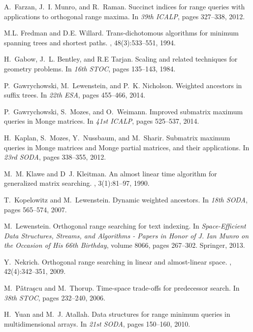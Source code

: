 \documentclass{llncs}
\begin{document}
\begin{thebibliography}{10}
A.~Farzan, J.~I. Munro, and R.~Raman.
\newblock Succinct indices for range queries with applications to orthogonal
  range maxima.
\newblock In {\em 39th ICALP}, pages 327--338, 2012.

M.L. Fredman and D.E. Willard.
\newblock Trans-dichotomous algorithms for minimum spanning trees and shortest
  paths.
, 48(3):533--551, 1994.

H.~Gabow, J.~L. Bentley, and R.E Tarjan.
\newblock Scaling and related techniques for geometry problems.
\newblock In {\em 16th STOC}, pages 135--143, 1984.

P.~Gawrychowski, M.~Lewenstein, and P.~K. Nicholson.
\newblock Weighted ancestors in suffix trees.
\newblock In {\em 22th ESA}, pages 455--466, 2014.

P.~Gawrychowski, S.~Mozes, and O.~Weimann.
\newblock Improved submatrix maximum queries in {M}onge matrices.
\newblock In {\em 41st ICALP}, pages 525--537, 2014.

H.~Kaplan, S.~Mozes, Y.~Nussbaum, and M.~Sharir.
\newblock Submatrix maximum queries in {M}onge matrices and {M}onge partial
  matrices, and their applications.
\newblock In {\em 23rd SODA}, pages 338--355, 2012.

M.~M. Klawe and D~J. Kleitman.
\newblock An almost linear time algorithm for generalized matrix searching.
, 3(1):81--97, 1990.

T.~Kopelowitz and M.~Lewenstein.
\newblock Dynamic weighted ancestors.
\newblock In {\em 18th SODA}, pages 565--574, 2007.

M.~Lewenstein.
\newblock Orthogonal range searching for text indexing.
\newblock In {\em Space-Efficient Data Structures, Streams, and Algorithms -
  Papers in Honor of J. Ian Munro on the Occasion of His 66th Birthday}, volume
  8066, pages 267--302. Springer, 2013.

Y.~Nekrich.
\newblock Orthogonal range searching in linear and almost-linear space.
, 42(4):342--351, 2009.

M.~P{\v{a}}tra{\c{s}}cu and M.~Thorup.
\newblock Time-space trade-offs for predecessor search.
\newblock In {\em 38th STOC}, pages 232--240, 2006.

H.~Yuan and M.~J. Atallah.
\newblock Data structures for range minimum queries in multidimensional arrays.
\newblock In {\em 21st SODA}, pages 150--160, 2010.

\end{thebibliography}



 
\end{document}
